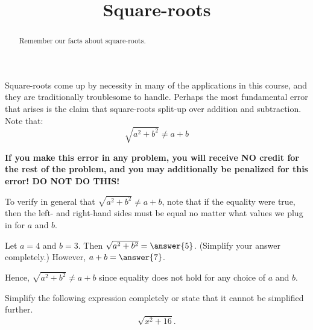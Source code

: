 \documentclass{ximera}
\title[Refresh:]{Square-roots}
\begin{document}
\begin{abstract}
  Remember our facts about square-roots.
\end{abstract}
\maketitle

\begin{problem}
  Square-roots come up by necessity in many of the applications in
  this course, and they are traditionally troublesome to
  handle. Perhaps the most fundamental error that arises is the claim
  that square-roots split-up over addition and subtraction. Note that:
  \[
  \sqrt{a^2+b^2} \ne a+ b
  \]
  \begin{warning}
    \textbf{If you make this error in any problem, you will receive NO
      credit for the rest of the problem, and you may additionally be
      penalized for this error! DO NOT DO THIS!}
  \end{warning}
  \begin{multipleChoice}
  \end{multipleChoice}
\end{problem}

\begin{problem}
  To verify in general that $\sqrt{a^2+b^2} \ne a+b$, note that if the equality were true, then the left- and right-hand sides must be equal no matter what values we plug in for $a$ and $b$.
  
  Let $a = 4$ and $b = 3$.
  Then $\sqrt{a^2 + b^2} = \answer{5}$.
  (Simplify your answer completely.)
  However, $a + b = \answer{7}$.
  
  Hence, $\sqrt{a^2 + b^2} \ne a + b$ since equality does not hold for any choice of $a$ and $b$.
\end{problem}

\begin{problem}
  Simplify the following expression completely or state that it cannot be simplified further.
  \[
    \sqrt{x^2 + 16}.
  \]
  \begin{multipleChoice}
  \end{multipleChoice}
\end{problem}
\end{document}
